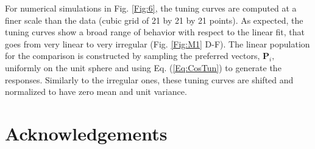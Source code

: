 \documentclass[a4paper]{article}%
\begin{document}
For numerical simulations in Fig. \ref{Fig:6}, the tuning curves are computed
at a finer scale than the data (cubic grid of 21 by 21 by 21 points). As
expected, the tuning curves show a broad range of behavior with respect to the
linear fit, that goes from very linear to very irregular (Fig. \ref{Fig:M1}
D-F). The linear population for the comparison is constructed by sampling the
preferred vectors, $\mathbf{P}_{i}, $  uniformly on the
unit sphere and using Eq. (\ref{Eq:CosTun}) to generate the responses.
Similarly to the irregular ones, these tuning curves are shifted and
normalized to have zero mean and unit variance.

\section{Acknowledgements}
\newpage
\end{document}
